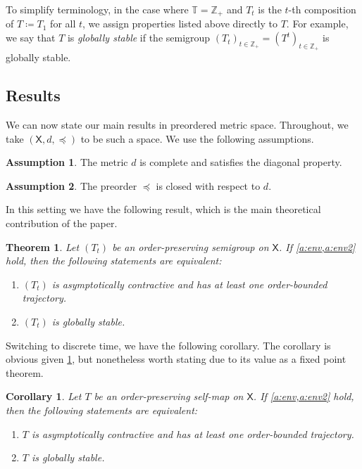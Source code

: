 \documentclass[12pt,reqno]{amsart}
\numberwithin{equation}{section}
\newtheorem{theorem}{Theorem}[section]
\newtheorem{corollary}{Corollary}[section]
\theoremstyle{definition}
\newtheorem{assumption}{Assumption}[section]
\newcommand{\1}{\mathbbm{1}}
\newcommand{\ZZ}{\mathbb{Z}}
\newcommand{\TT}{\mathbb T}
\newcommand{\Xsf}{\mathsf{X}}
\newcommand{\navy}[1]{\textit{\textcolor{blue!40!black}{#1}}}
\begin{document}
To simplify terminology, in the case where $\TT = \ZZ_+$ and $T_t$ is the $t$-th
composition of $T \coloneq T_1$ for all $t$, we assign properties
listed above directly to $T$.  For example, we say that $T$ is \navy{globally
stable} if the semigroup $(T_t)_{t \in \ZZ_+} = (T^t)_{t \in \ZZ_+}$ is globally stable.


\subsection{Results}

We can now state our main results in preordered metric space.
Throughout, we take $(\Xsf, d, \preceq)$ to be such a space.
We use the following
assumptions.

\begin{assumption}\label{a:env}
    The metric $d$ is complete and satisfies the diagonal property.
\end{assumption}

\begin{assumption}\label{a:env2}
    The preorder $\preceq$ is closed with respect to $d$.
\end{assumption}

In this setting we have the following result,
which is the main theoretical contribution of the paper.

\begin{theorem}\label{t:bk}
    Let $(T_t)$ be an order-preserving semigroup on $\Xsf$. 
    If \cref{a:env,a:env2} hold, then
    the following statements are equivalent:
    \begin{enumerate}
        \item $(T_t)$ is asymptotically contractive and has at least one
            order-bounded trajectory.
        \item $(T_t)$ is globally stable.
    \end{enumerate}
\end{theorem}

Switching to discrete time, we have the following corollary.
The corollary is obvious given \cref{t:bk}, but nonetheless worth stating due to
its value as a fixed point theorem.

\begin{corollary}\label{c:bk}
    Let $T$ be an order-preserving self-map on $\Xsf$.
    If \cref{a:env,a:env2} hold, then
    the following statements are equivalent:
    \begin{enumerate}
        \item $T$ is asymptotically contractive and has at least one
            order-bounded trajectory.
        \item $T$ is globally stable.
    \end{enumerate}
\end{corollary}
\end{document}
